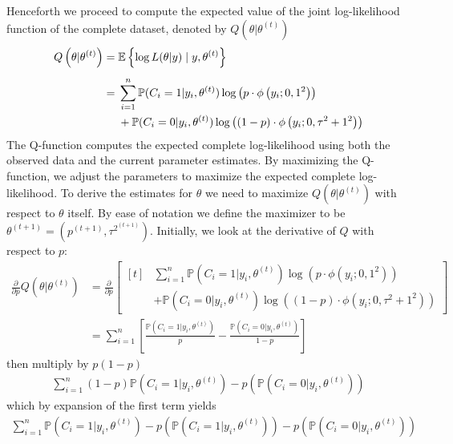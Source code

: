 Henceforth we proceed to compute the expected value of the joint log-likelihood function of the complete dataset, denoted by $Q\left(\theta | \theta^{(t)}\right)$ 
\begin{align}
    Q\left(\theta | \theta^{(t)}\right) &= \mathbb{E}\left\{ \log L(\theta | y) \mid y, \theta^{(t)}\right\} \\[5pt]
    &= \begin{aligned}[t]
       & \sum_{i=1}^{n} \mathbb{P}(C_i = 1 | y_i, \theta^{(t)}) \log\left(p \cdot \phi\left(y_i ; 0,1^2\right)\right) \\
       & + \mathbb{P}(C_i = 0 | y_i, \theta^{(t)}) \log\left((1-p) \cdot \phi\left(y_i ; 0, \tau^2+1^2\right)\right)
       \end{aligned}
\end{align}
The Q-function computes the expected complete log-likelihood using both the observed data and the current parameter estimates. By maximizing the Q-function, we adjust the parameters to maximize the expected complete log-likelihood. \spaze
To derive the estimates for $\theta$ we need to maximize $Q(\theta|\theta^{(t)})$ with respect to $\theta$ itself. By ease of notation we define the maximizer to be $\theta^{(t+1)} = \left(p^{(t+1)}, \tau^{{2}^{(t+1)}} \right)$. \spaze 
Initially, we look at the derivative of $Q$ with respect to $p$: 
\begin{align}
    \frac{\partial }{\partial p} Q(\theta| \theta^{(t)}) &= \frac{\partial }{\partial p} \left[ \begin{aligned}[t]
       & \sum_{i=1}^{n} \mathbb{P}(C_i = 1 | y_i, \theta^{(t)}) \log\left(p \cdot \phi\left(y_i ; 0,1^2\right)\right) \\
       & + \mathbb{P}(C_i = 0 | y_i, \theta^{(t)}) \log\left((1-p) \cdot \phi\left(y_i ; 0, \tau^2+1^2\right)\right)
       \end{aligned} \right] \\[10pt]
       &= \sum_{i=1}^{n} \left[ \frac{{\mathbb{P}(C_i = 1 | y_i, \theta^{(t)})}}{{p}} - \frac{{\mathbb{P}(C_i = 0 | y_i, \theta^{(t)})}}{{1-p}} \right]
\end{align} 
then multiply by $p(1-p)$ 
\begin{align*}
    \sum_{i=1}^{n} (1-p) \mathbb{P}\left(C_i = 1 | y_i, \theta^{(t)}\right) - p \left( \mathbb{P}\left(C_i = 0 | y_i, \theta^{(t)}\right) \right)
\end{align*}
which by expansion of the first term yields 
\begin{align*}
     \sum_{i=1}^{n} \mathbb{P}\left(C_i = 1 | y_i, \theta^{(t)}\right) - p \left( \mathbb{P}\left(C_i = 1 | y_i, \theta^{(t)}\right) \right) - p \left( \mathbb{P}\left(C_i = 0 | y_i, \theta^{(t)}\right) \right)
\end{align*}
